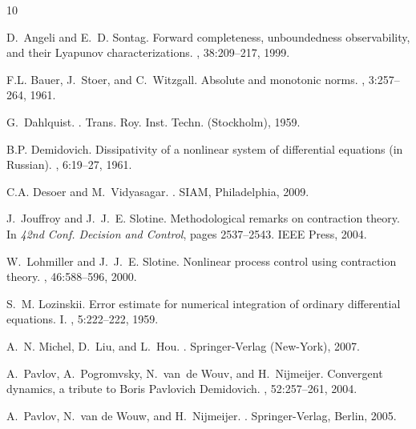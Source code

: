 \documentclass{svmult}
\begin{document}
\begin{thebibliography}{10}

D.~Angeli and E.~D. Sontag.
\newblock Forward completeness, unboundedness observability, and their
  {L}yapunov characterizations.
, 38:209--217, 1999.

F.L. Bauer, J.~Stoer, and C.~Witzgall.
\newblock Absolute and monotonic norms.
, 3:257--264, 1961.

G.~Dahlquist.
.
\newblock Trans. Roy. Inst. Techn. (Stockholm), 1959.

B.P. Demidovich.
\newblock Dissipativity of a nonlinear system of differential equations (in
  {R}ussian).
, 6:19--27,
  1961.

C.A. Desoer and M.~Vidyasagar.
.
\newblock SIAM, Philadelphia, 2009.

J.~Jouffroy and J.~J.~E. Slotine.
\newblock Methodological remarks on contraction theory.
\newblock In {\em 42nd Conf. Decision and Control}, pages 2537--2543. IEEE
  Press, 2004.

W.~Lohmiller and J.~J.~E. Slotine.
\newblock Nonlinear process control using contraction theory.
, 46:588--596, 2000.

S.~M. Lozinskii.
\newblock Error estimate for numerical integration of ordinary differential
  equations. {I}.
, 5:222--222, 1959.

A.~N. Michel, D.~Liu, and L.~Hou.
.
\newblock Springer-Verlag (New-York), 2007.

A.~Pavlov, A.~Pogromvsky, N.~van~de Wouv, and H.~Nijmeijer.
\newblock Convergent dynamics, a tribute to {B}oris {P}avlovich {D}emidovich.
, 52:257--261, 2004.

A.~Pavlov, N.~{van de Wouw}, and H.~Nijmeijer.
.
\newblock Springer-Verlag, Berlin, 2005.


\end{thebibliography}
\end{document}
